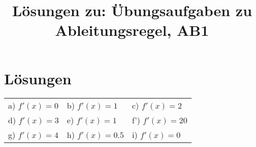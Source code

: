 \documentclass[10pt,a4paper]{article}
\begin{document}
	
\title{Lösungen zu: Übungsaufgaben zu Ableitungsregel, AB1}

\makeatletter
\def\@maketitle{%
  \newpage
  \null
  \vskip 2em%
  \begin{center}%
  \let \footnote \thanks
    {\Huge\bfseries\@title \par}%
    \vskip 1.5em%
    {\large
      \lineskip .5em%
      \begin{tabular}[t]{c}%
        \@author
      \end{tabular}\par}%
    \vskip 1em%
    {\large \@date}%
  \end{center}%
  \par
  \vskip 1.5em}
\makeatother

\author{}
\date{}

\maketitle

\section*{Lösungen}

\begin{tabular}{l l l}

	a) $f'(x) = 0$ & b) $f'(x) = 1$   & c) $f'(x) = 2$ \\
	d) $f'(x) = 3$ & e) $f'(x) = 1$   & f') $f'(x) = 20$ \\
	g) $f'(x) = 4$ & h) $f'(x) = 0.5$ & i) $f'(x) = 0$

\end{tabular}
\end{document}
